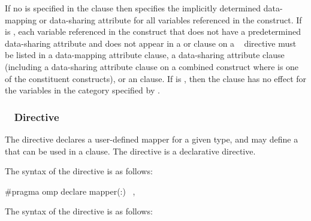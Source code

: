 If no  is specified in the clause then
 specifies the implicitly determined data-mapping or
data-sharing attribute for all variables referenced in the construct.  If
 is , each variable referenced in the
construct that does not have a predetermined data-sharing attribute and does
not appear in a  or  clause on a ~
directive must be listed in a data-mapping attribute clause, a data-sharing
attribute clause (including a data-sharing attribute clause on a combined
construct where  is one of the constituent constructs), or
an  clause. If  is ,
then the clause has no effect for the variables in the category specified by
.



\subsubsection{~ Directive}
\label{subsubsec:declare mapper Directive}

\summary

The  directive declares a user-defined mapper for a given
type, and may define a  that can be used in a 
clause. The  directive is a declarative directive.

\syntax
\begin{ccppspecific}
The syntax of the  directive is as follows:

\begin{ompcPragma}
#pragma omp declare mapper(\plc{[mapper-identifier}:\plc{]type var}) \
            \plc{[clause[ [},\plc{] clause] ... ] new-line}
\end{ompcPragma}

\end{ccppspecific}

\begin{fortranspecific}
The syntax of the  directive is as follows:

\end{fortranspecific}

